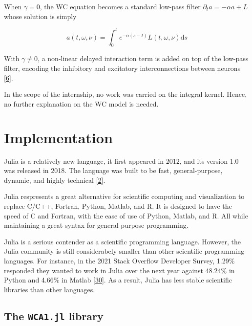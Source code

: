 \documentclass[american,]{article}
\theoremstyle{definition}
\theoremstyle{definition}
\theoremstyle{definition}
\theoremstyle{remark}
\begin{document}
When \(\gamma=0\), the WC equation becomes a standard low-pass filter \(\partial_t a=-\alpha a + L\)
whose solution is simply

\begin{equation}
a(t,\omega,\nu) = \int_0^t e^{-\alpha(s-t)}L(t,\omega,\nu)\mathrm{d}s
\end{equation}

With \(\gamma\neq0\), a non-linear delayed interaction term is added on top
of the low-pass filter, encoding the inhibitory and excitatory interconnections between neurons {[}\protect\hyperlink{ref-boscain2021}{6}{]}.

In the scope of the internship, no work was carried on the integral kernel.
Hence, no further explanation on the WC model is needed.

\pagebreak

\hypertarget{implementation}{%
\section{Implementation}\label{implementation}}

Julia is a relatively new language, it first appeared in 2012,
and its version 1.0 was released in 2018.
The language was built to be fast, general-purpose, dynamic,
and highly technical {[}\protect\hyperlink{ref-julia2018}{2}{]}.

Julia respresents a great alternative for scientific computing
and visualization to replace C/C++, Fortran, Python, Matlab, and R.
It is designed to have the speed of C and Fortran,
with the ease of use of Python, Matlab, and R.
All while maintaining a great syntax for general purpose programming.

Julia is a serious contender as a scientific programming language.
However, the Julia community is still considerabely smaller
than other scientific programming languages.
For instance, in the 2021 Stack Overflow Developer Survey,
1.29\% responded they wanted to work in Julia over the next year
against 48.24\% in Python and 4.66\% in Matlab {[}\protect\hyperlink{ref-so_survey2021}{30}{]}.
As a result, Julia has less stable scientific libraries than
other languages.

\hypertarget{the-wca1.jl-library}{%
\subsection{\texorpdfstring{The \texttt{WCA1.jl} library}{The WCA1.jl library}}\label{the-wca1.jl-library}}
\end{document}
